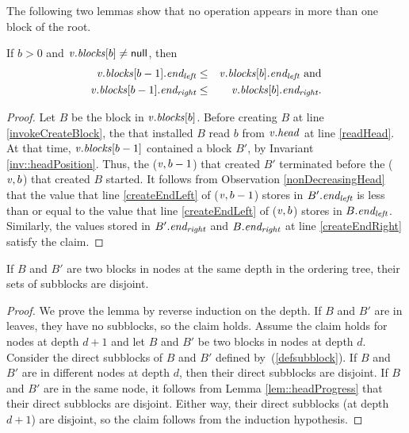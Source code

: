 The following two lemmas show that no operation appears in more than one block of the root.
\begin{lemma} \label{lem::headProgress}
 If $b>0$ and $\mbox{\textnormal{\textit{v}}}.\mbox{\textit{blocks}}[b] \neq \mbox{\sf null}$, then
 \begin{eqnarray*}
 \mbox{\textnormal{\textit{v}}}.\mbox{\textit{blocks}}[b-1].\mbox{\textit{end\textsubscript{left}}} &\leq& \mbox{\textnormal{\textit{v}}}.\mbox{\textit{blocks}}[b].\mbox{\textit{end\textsubscript{left}}} \mbox{ and}\\
 \mbox{\textnormal{\textit{v}}}.\mbox{\textit{blocks}}[b-1].\mbox{\textit{end\textsubscript{right}}} &\leq& \mbox{\textnormal{\textit{v}}}.\mbox{\textit{blocks}}[b].\mbox{\textit{end\textsubscript{right}}}.
 \end{eqnarray*}
\end{lemma}
\begin{proof}
Let $B$ be the block in $\mbox{\textnormal{\textit{v}}}.\mbox{\textit{blocks}}[b]$.
Before creating $B$ at line \ref{invokeCreateBlock}, the  that installed $B$
read $b$ from $\mbox{\textnormal{\textit{v}}}.\mbox{\textit{head}}$ at line \ref{readHead}.
At that time, $\mbox{\textnormal{\textit{v}}}.\mbox{\textit{blocks}}[b-1]$ contained a block $B'$, by Invariant \ref{inv::headPosition}.
Thus, the ($\mbox{\textnormal{\textit{v}}},b-1$) that created $B'$ terminated before the ($\mbox{\textnormal{\textit{v}}},b$) that
created $B$ started.
It follows from Observation \ref{nonDecreasingHead} that the value that 
line \ref{createEndLeft} of ($\mbox{\textnormal{\textit{v}}},b-1$) stores in $B'.\mbox{\textit{end\textsubscript{left}}}$   
is less than or equal to the value that line \ref{createEndLeft} of ($\mbox{\textnormal{\textit{v}}},b$) 
stores in $B.\mbox{\textit{end\textsubscript{left}}}$.
Similarly, the values stored in $B'.\mbox{\textit{end\textsubscript{right}}}$ and $B.\mbox{\textit{end\textsubscript{right}}}$ at line \ref{createEndRight} 
satisfy the claim.
\end{proof}

\begin{lemma} \label{lem::subblocksDistinct}
If $B$ and $B'$ are two  blocks in nodes at the same depth in the ordering tree, their sets of subblocks are disjoint.
\end{lemma}
\begin{proof}
We prove the lemma by reverse induction on the depth.
If $B$ and $B'$ are in leaves, they have no subblocks, so the claim holds.
Assume the claim holds for nodes at depth $d+1$ and let $B$ and $B'$ be two blocks in nodes at depth $d$.
Consider the direct subblocks of $B$ and $B'$ defined by~(\ref{defsubblock}).
If $B$ and $B'$ are in different nodes at depth $d$, then their direct subblocks are disjoint.
If $B$ and $B'$ are in the same node, it follows from Lemma \ref{lem::headProgress} that their direct subblocks are disjoint.
Either way, their direct subblocks (at depth $d+1$) are disjoint, so the claim follows from the induction hypothesis.
\end{proof}

